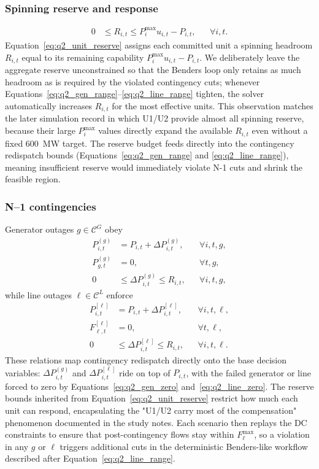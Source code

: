 \documentclass{apmcmthesis}
\begin{document}
\subsubsection{Spinning reserve and response}
\begin{align}
    0 &\le R_{i,t} \le P_i^{\max} u_{i,t} - P_{i,t}, && \forall i,t. \label{eq:q2_unit_reserve}
\end{align}
\noindent Equation~\eqref{eq:q2_unit_reserve} assigns each committed unit a spinning headroom $R_{i,t}$ equal to its remaining capability $P_i^{\max} u_{i,t}-P_{i,t}$.
We deliberately leave the aggregate reserve unconstrained so that the Benders loop only retains as much headroom as is required by the violated contingency cuts; whenever Equations~\eqref{eq:q2_gen_range}--\eqref{eq:q2_line_range} tighten, the solver automatically increases $R_{i,t}$ for the most effective units.
This observation matches the later simulation record in which U1/U2 provide almost all spinning reserve, because their large $P_i^{\max}$ values directly expand the available $R_{i,t}$ even without a fixed 600~MW target.
The reserve budget feeds directly into the contingency redispatch bounds (Equations~\eqref{eq:q2_gen_range} and \eqref{eq:q2_line_range}), meaning insufficient reserve would immediately violate N-1 cuts and shrink the feasible region.

\subsubsection{N--1 contingencies}
Generator outages $g\in\mathcal{C}^G$ obey
\begin{align}
    P_{i,t}^{(g)} &= P_{i,t} + \Delta P_{i,t}^{(g)}, && \forall i,t,g, \label{eq:q2_gen_rel} \\
    P_{g,t}^{(g)} &= 0, && \forall t,g, \label{eq:q2_gen_zero} \\
    0 &\le \Delta P_{i,t}^{(g)} \le R_{i,t}, && \forall i,t,g, \label{eq:q2_gen_range}
\end{align}
while line outages $\ell\in\mathcal{C}^L$ enforce
\begin{align}
    P_{i,t}^{[\ell]} &= P_{i,t} + \Delta P_{i,t}^{[\ell]}, && \forall i,t,\ell, \label{eq:q2_line_rel} \\
    F_{\ell,t}^{[\ell]} &= 0, && \forall t,\ell, \label{eq:q2_line_zero} \\
    0 &\le \Delta P_{i,t}^{[\ell]} \le R_{i,t}, && \forall i,t,\ell. \label{eq:q2_line_range}
\end{align}
\noindent These relations map contingency redispatch directly onto the base decision variables: $\Delta P_{i,t}^{(g)}$ and $\Delta P_{i,t}^{[\ell]}$ ride on top of $P_{i,t}$, with the failed generator or line forced to zero by Equations~\eqref{eq:q2_gen_zero} and~\eqref{eq:q2_line_zero}.
The reserve bounds inherited from Equation~\eqref{eq:q2_unit_reserve} restrict how much each unit can respond, encapsulating the "U1/U2 carry most of the compensation" phenomenon documented in the study notes.
Each scenario then replays the DC constraints to ensure that post-contingency flows stay within $F_\ell^{\max}$, so a violation in any $g$ or $\ell$ triggers additional cuts in the deterministic Benders-like workflow described after Equation~\eqref{eq:q2_line_range}.
\end{document}
